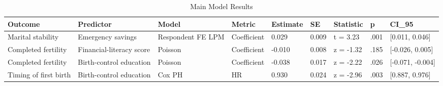 \begin{table}

\caption{Main Model Results}
\centering
\begin{tabular}[t]{lllllllll}
\toprule
Outcome & Predictor & Model & Metric & Estimate & SE & Statistic & p & CI\_95\\
\midrule
Marital stability & Emergency savings & Respondent FE LPM & Coefficient & 0.029 & 0.009 & t = 3.23 & .001 & {}[0.011, 0.046]\\
Completed fertility & Financial-literacy score & Poisson & Coefficient & -0.010 & 0.008 & z = -1.32 & .185 & {}[-0.026, 0.005]\\
Completed fertility & Birth-control education & Poisson & Coefficient & -0.038 & 0.017 & z = -2.22 & .026 & {}[-0.071, -0.004]\\
Timing of first birth & Birth-control education & Cox PH & HR & 0.930 & 0.024 & z = -2.96 & .003 & {}[0.887, 0.976]\\
\bottomrule
\end{tabular}
\end{table}
